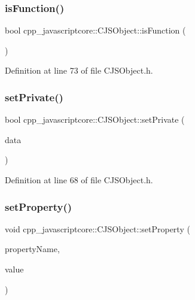 \subsubsection{\texorpdfstring{is\+Function()}{isFunction()}}
{\footnotesize\ttfamily bool cpp\+\_\+javascriptcore\+::\+C\+J\+S\+Object\+::is\+Function (\begin{DoxyParamCaption}{ }\end{DoxyParamCaption})\hspace{0.3cm}{\ttfamily [inline]}}



Definition at line 73 of file C\+J\+S\+Object.\+h.

\mbox{\label{classcpp__javascriptcore_1_1_c_j_s_object_a34c765e46113b0574dd0e5d2624d81b7}} 
\subsubsection{\texorpdfstring{set\+Private()}{setPrivate()}}
{\footnotesize\ttfamily bool cpp\+\_\+javascriptcore\+::\+C\+J\+S\+Object\+::set\+Private (\begin{DoxyParamCaption}\item[{void $\ast$}]{data }\end{DoxyParamCaption})\hspace{0.3cm}{\ttfamily [inline]}}



Definition at line 68 of file C\+J\+S\+Object.\+h.

\mbox{\label{classcpp__javascriptcore_1_1_c_j_s_object_a203fbfb9f14e8b8eb4929b59e9908ede}} 
\subsubsection{\texorpdfstring{set\+Property()}{setProperty()}}
{\footnotesize\ttfamily void cpp\+\_\+javascriptcore\+::\+C\+J\+S\+Object\+::set\+Property (\begin{DoxyParamCaption}\item[{const std\+::string \&}]{property\+Name,  }\item[{J\+S\+Value\+Ref}]{value }\end{DoxyParamCaption})\hspace{0.3cm}{\ttfamily [inline]}}



